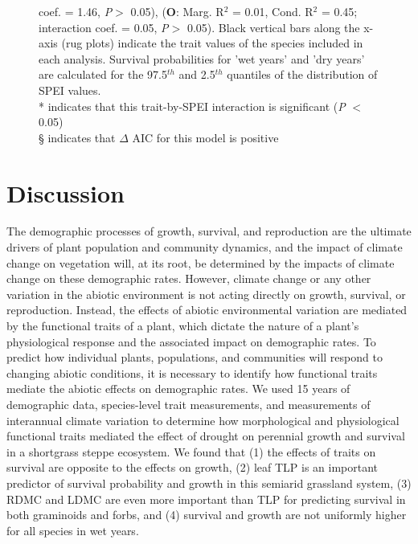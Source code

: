 \documentclass[12pt, letterpaper]{article}
\begin{document}
\begin{figure}
{coef. = 1.46, \textit{P}$>$ 0.05), (\textbf{O}: Marg. R$^2$ = 0.01, Cond. R$^2$ = 0.45; interaction coef. = 0.05, \textit{P}$>$ 0.05). Black vertical bars along the x-axis (rug plots) indicate the trait values of the species included in each analysis. Survival probabilities for 'wet years' and 'dry years' are calculated for the 97.5$^{th}$ and 2.5$^{th}$ quantiles of the distribution of SPEI values. \\
* indicates that this trait-by-SPEI interaction is significant (\textit{P} $<$ 0.05)\\
§ indicates that $\Delta$ AIC for this model is positive
}
 \label{fig:test}
\end{figure}

\section{Discussion}
The demographic processes of growth, survival, and reproduction are the ultimate drivers of plant population and community dynamics, and the impact of climate change on vegetation will, at its root, be determined by the impacts of climate change on these demographic rates. However, climate change or any other variation in the abiotic environment is not acting directly on growth, survival, or reproduction. Instead, the effects of abiotic environmental variation are mediated by the functional traits of a plant, which dictate the nature of a plant's physiological response and the associated impact on demographic rates. To predict how individual plants, populations, and communities will respond to changing abiotic conditions, it is necessary to identify how functional traits mediate the abiotic effects on demographic rates. We used 15 years of demographic data, species-level trait measurements, and measurements of interannual climate variation to determine how morphological and physiological functional traits mediated the effect of drought on perennial growth and survival in a shortgrass steppe ecosystem. We found that (1) the effects of traits on survival are opposite to the effects on growth, (2) leaf TLP is an important predictor of survival probability and growth in this semiarid grassland system, (3) RDMC and LDMC are even more important than TLP for predicting survival in both graminoids and forbs, and (4) survival and growth are not uniformly higher for all species in wet years. 
\end{document}
